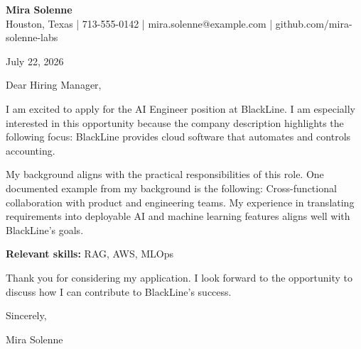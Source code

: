 \documentclass[11pt]{article}
\begin{document}
\begin{center}
{\Large\bfseries Mira Solenne}\\
Houston, Texas | 713-555-0142 | mira.solenne@example.com | github.com/mira-solenne-labs
\end{center}

July 22, 2026

Dear Hiring Manager,

I am excited to apply for the AI Engineer position at BlackLine. I am especially interested in this opportunity because the company description highlights the following focus: BlackLine provides cloud software that automates and controls accounting.

My background aligns with the practical responsibilities of this role. One documented example from my background is the following: Cross-functional collaboration with product and engineering teams. My experience in translating requirements into deployable AI and machine learning features aligns well with BlackLine's goals.

\textbf{Relevant skills:} RAG, AWS, MLOps

Thank you for considering my application. I look forward to the opportunity to discuss how I can contribute to BlackLine's success.

Sincerely,

Mira Solenne
\end{document}
